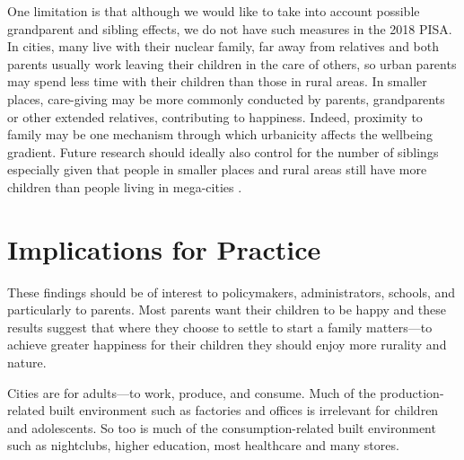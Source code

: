 \documentclass[11pt, letterpaper]{article}
\begin{document}
\begin{spacing}{1.9}
One limitation is that although we would like to take into account possible grandparent and sibling effects, we do not have such measures in the 2018 PISA. %
In cities, many live with their nuclear family, far away from relatives and both
parents usually work leaving their children in the  care of others, so urban parents
may spend less time with their children than those in rural areas. In smaller
places, care-giving may be
more commonly conducted by parents, grandparents or other extended relatives,
contributing to happiness. Indeed, proximity to family may be one mechanism through which urbanicity affects the wellbeing gradient.  
Future research should ideally also  control for the number of siblings
especially given that people in smaller places and rural areas still have more children than people living in mega-cities \citep{lerch2019regional}. %
\section*{Implications for Practice}


These findings should be of interest to policymakers, administrators, schools, and particularly to parents. Most parents want their children to be happy and these results suggest that where they choose to settle to start a family matters---to achieve greater happiness for their children they should enjoy more rurality and nature. 

Cities are  for adults---to work, produce, and consume. Much of  the production-related built environment such as factories and offices is irrelevant for children and adolescents. %
 So too is much of the consumption-related built environment  such as
 nightclubs, higher education, most healthcare and many stores. 


\end{spacing}
\end{document}
